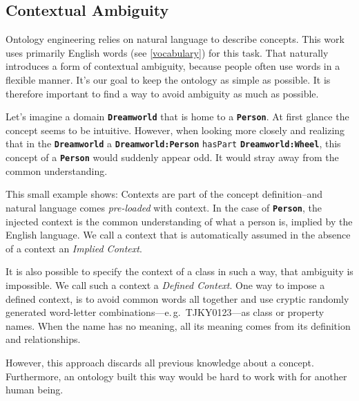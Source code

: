 \documentclass[a4paper, DIV=13, BCOR=0cm]{scrbook}
\newcommand{\eg}{e.\,g.\ }
\newcommand{\class}[1]{\texttt{\textbf{#1}}}
\newcommand{\relation}[1]{\texttt{#1}}
\begin{document}

\subsection{Contextual Ambiguity}
Ontology engineering relies on natural language to describe concepts. This work uses primarily English words (see \autoref{vocabulary}) for this task. That naturally introduces a form of contextual ambiguity, because people often use words in a flexible manner. \cite[p.\,7, 1.5.2]{uschold1998enterprise}  It's our goal to keep the ontology as simple as possible. It is therefore important to find a way to avoid ambiguity as much as possible.

Let's imagine a domain \class{Dreamworld} that is home to a \class{Person}. At first glance the concept seems to be intuitive. However, when looking more closely and realizing that in the \class{Dreamworld} a \class{Dreamworld:Person} \relation{hasPart} \class{Dreamworld:Wheel}, this concept of a \class{Person} would suddenly appear odd. It would stray away from the common understanding.

This small example shows: Contexts are part of the concept definition--and natural language comes \textit{pre-loaded} with context. In the case of \class{Person}, the injected context is the common understanding of what a person is, implied by the English language. We call a context that is automatically assumed in the absence of a context an \textit{Implied Context}.

It is also possible to specify the context of a class in such a way, that ambiguity is impossible. We call such a context a \textit{Defined Context}. One way to impose a defined context, is to avoid common words all together and use cryptic randomly generated word-letter combinations---\eg TJKY0123---as class or property names. When the name has no meaning, all its meaning comes from its definition and relationships.

However, this approach discards all previous knowledge about a concept. Furthermore, an ontology built this way would be hard to work with for another human being.
\end{document}
